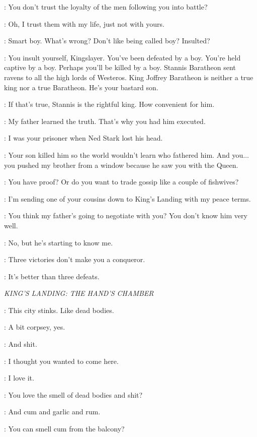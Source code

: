 \JAIME: You don't trust the loyalty of the men following you into battle?

\ROBB: Oh, I trust them with my life, just not with yours.

\JAIME: Smart boy. What's wrong? Don't like being called boy? Insulted?

\ROBB: You insult yourself, Kingslayer. You've been defeated by a boy. You're held captive by a boy. Perhaps you'll be killed by a boy. Stannis Baratheon sent ravens to all the high lords of Westeros. King Joffrey Baratheon is neither a true king nor a true Baratheon. He's your bastard son.

\JAIME: If that's true, Stannis is the rightful king. How convenient for him.

\ROBB: My father learned the truth. That's why you had him executed.

\JAIME: I was your prisoner when Ned Stark lost his head.

\ROBB: Your son killed him so the world wouldn't learn who fathered him. And you$\ldots$ you pushed my brother from a window because he saw you with the Queen.

\JAIME: You have proof? Or do you want to trade gossip like a couple of fishwives?

\ROBB: I'm sending one of your cousins down to King's Landing with my peace terms.

\JAIME: You think my father's going to negotiate with you? You don't know him very well.

\ROBB: No, but he's starting to know me.

\JAIME: Three victories don't make you a conqueror.

\ROBB: It's better than three defeats.


\scene

\textit{KING'S LANDING: THE HAND'S CHAMBER}


\SHAE: This city stinks. Like dead bodies.

\TYRION: A bit corpsey, yes.

\SHAE: And shit.

\TYRION: I thought you wanted to come here.

\SHAE: I love it.

\TYRION: You love the smell of dead bodies and shit?

\SHAE: And cum and garlic and rum.

\TYRION: You can smell cum from the balcony?

